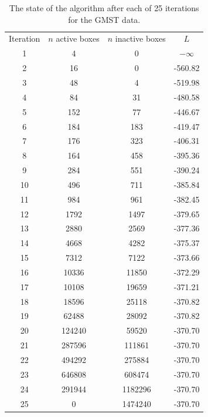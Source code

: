 \documentclass{report}
\begin{document}
\begin{table}[H]
\centering
\begin{tabular}{|c|c|c|c|}
\hline
Iteration & $n$ active boxes & $n$ inactive boxes & $L$\\
1 & 4 & 0 & $-\infty$\\
2 & 16 & 0 & -560.82\\
3 & 48 & 4 & -519.98\\
4 & 84 & 31 & -480.58\\
5 & 152 & 77 & -446.67\\
6 & 184 & 183 & -419.47\\
7 & 176 & 323 & -406.31\\
8 & 164 & 458 & -395.36\\
9 & 284 & 551 & -390.24\\
10 & 496 & 711 & -385.84\\
11 & 984 & 961 & -382.45\\
12 & 1792 & 1497 & -379.65\\
13 & 2880 & 2569 & -377.36\\
14 & 4668 & 4282 & -375.37\\
15 & 7312 & 7122 & -373.66\\
16 & 10336 & 11850 & -372.29\\
17 & 10108 & 19659 & -371.21\\
18 & 18596 & 25118 & -370.82\\
19 & 62488 & 28092 & -370.82\\
20 & 124240 & 59520 & -370.70\\
21 & 287596 & 111861 & -370.70\\
22 & 494292 & 275884 & -370.70\\
23 & 646808 & 608474 & -370.70\\
24 & 291944 & 1182296 & -370.70\\
25 & 0 & 1474240 & -370.70\\
\hline
\end{tabular}
\caption{The state of the algorithm after each of 25 iterations for the GMST data.}
\label{table:gmst_output}
\end{table}
\end{document}
